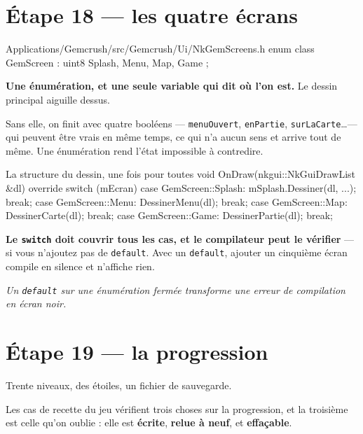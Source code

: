 \section{Étape 18 --- les quatre écrans}

\begin{nkcode}{Applications/Gemcrush/src/Gemcrush/Ui/NkGemScreens.h}
enum class GemScreen : uint8 { Splash, Menu, Map, Game };
\end{nkcode}

\begin{nkretenir}
\textbf{Une énumération, et une seule variable qui dit où l'on est.} Le dessin
principal aiguille dessus.

Sans elle, on finit avec quatre booléens --- \texttt{menuOuvert},
\texttt{enPartie}, \texttt{surLaCarte}\dots --- qui peuvent être vrais en même
temps, ce qui n'a aucun sens et arrive tout de même. Une énumération rend l'état
impossible à contredire.
\end{nkretenir}

\begin{nkcode}{La structure du dessin, une fois pour toutes}
void OnDraw(nkgui::NkGuiDrawList &dl) override {
    switch (mEcran) {
        case GemScreen::Splash: mSplash.Dessiner(dl, ...);  break;
        case GemScreen::Menu:   DessinerMenu(dl);           break;
        case GemScreen::Map:    DessinerCarte(dl);          break;
        case GemScreen::Game:   DessinerPartie(dl);         break;
    }
}
\end{nkcode}

\begin{nkpiege}
\textbf{Le \texttt{switch} doit couvrir tous les cas, et le compilateur peut le
vérifier} --- si vous n'ajoutez pas de \texttt{default}. Avec un
\texttt{default}, ajouter un cinquième écran compile en silence et n'affiche
rien.

\emph{Un \texttt{default} sur une énumération fermée transforme une erreur de
compilation en écran noir.}
\end{nkpiege}

\section{Étape 19 --- la progression}

Trente niveaux, des étoiles, un fichier de sauvegarde.

\begin{nkretenir}
Les cas de recette du jeu vérifient trois choses sur la progression, et la
troisième est celle qu'on oublie : elle est \textbf{écrite}, \textbf{relue à
neuf}, et \textbf{effaçable}.
\end{nkretenir}

